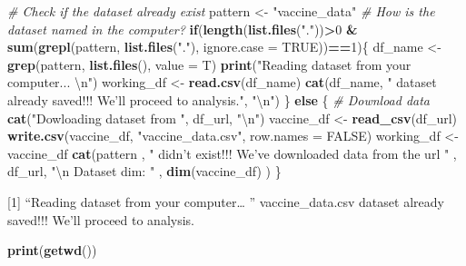 \documentclass[]{article}
\newenvironment{Shaded}{\begin{snugshade}}{\end{snugshade}}
\newcommand{\CharTok}[1]{\textcolor[rgb]{0.31,0.60,0.02}{#1}}
\newcommand{\CommentTok}[1]{\textcolor[rgb]{0.56,0.35,0.01}{\textit{#1}}}
\newcommand{\ControlFlowTok}[1]{\textcolor[rgb]{0.13,0.29,0.53}{\textbf{#1}}}
\newcommand{\DataTypeTok}[1]{\textcolor[rgb]{0.13,0.29,0.53}{#1}}
\newcommand{\DecValTok}[1]{\textcolor[rgb]{0.00,0.00,0.81}{#1}}
\newcommand{\KeywordTok}[1]{\textcolor[rgb]{0.13,0.29,0.53}{\textbf{#1}}}
\newcommand{\NormalTok}[1]{#1}
\newcommand{\OperatorTok}[1]{\textcolor[rgb]{0.81,0.36,0.00}{\textbf{#1}}}
\newcommand{\OtherTok}[1]{\textcolor[rgb]{0.56,0.35,0.01}{#1}}
\newcommand{\StringTok}[1]{\textcolor[rgb]{0.31,0.60,0.02}{#1}}
\begin{document}
\begin{Shaded}
\begin{Highlighting}[]
\CommentTok{# Check if the dataset already exist}
\NormalTok{pattern <-}\StringTok{ "vaccine_data"} \CommentTok{# How is the dataset named in the computer?}
\ControlFlowTok{if}\NormalTok{(}\KeywordTok{length}\NormalTok{(}\KeywordTok{list.files}\NormalTok{(}\StringTok{"."}\NormalTok{))}\OperatorTok{>}\DecValTok{0} \OperatorTok{&}\StringTok{ }\KeywordTok{sum}\NormalTok{(}\KeywordTok{grepl}\NormalTok{(pattern, }\KeywordTok{list.files}\NormalTok{(}\StringTok{"."}\NormalTok{), }\DataTypeTok{ignore.case =} \OtherTok{TRUE}\NormalTok{))}\OperatorTok{==}\DecValTok{1}\NormalTok{)\{}
\NormalTok{    df_name <-}\StringTok{ }\KeywordTok{grep}\NormalTok{(pattern, }\KeywordTok{list.files}\NormalTok{(), }\DataTypeTok{value =}\NormalTok{ T)}
    \KeywordTok{print}\NormalTok{(}\StringTok{"Reading dataset from your computer... }\CharTok{\textbackslash{}n}\StringTok{"}\NormalTok{)}
\NormalTok{    working_df <-}\StringTok{ }\KeywordTok{read.csv}\NormalTok{(df_name)}
    \KeywordTok{cat}\NormalTok{(df_name, }\StringTok{" dataset already saved!!! We'll proceed to analysis."}\NormalTok{, }\StringTok{"}\CharTok{\textbackslash{}n}\StringTok{"}\NormalTok{)}
\NormalTok{\} }\ControlFlowTok{else}\NormalTok{ \{}
    \CommentTok{# Download data}
    \KeywordTok{cat}\NormalTok{(}\StringTok{"Dowloading dataset from "}\NormalTok{, df_url, }\StringTok{"}\CharTok{\textbackslash{}n}\StringTok{"}\NormalTok{)}
\NormalTok{    vaccine_df <-}\StringTok{ }\KeywordTok{read_csv}\NormalTok{(df_url)}
    \KeywordTok{write.csv}\NormalTok{(vaccine_df, }\StringTok{"vaccine_data.csv"}\NormalTok{, }\DataTypeTok{row.names =} \OtherTok{FALSE}\NormalTok{)}
\NormalTok{    working_df <-}\StringTok{ }\NormalTok{vaccine_df}
    \KeywordTok{cat}\NormalTok{(pattern}
\NormalTok{        , }\StringTok{" didn't exist!!! We've downloaded data from the url "}
\NormalTok{        , df_url, }\StringTok{"}\CharTok{\textbackslash{}n}\StringTok{ Dataset dim: "}
\NormalTok{        , }\KeywordTok{dim}\NormalTok{(vaccine_df)}
\NormalTok{    )}
\NormalTok{\}}
\end{Highlighting}
\end{Shaded}

{[}1{]} ``Reading dataset from your computer\ldots{} \n''
vaccine\_data.csv dataset already saved!!! We'll proceed to analysis.

\begin{Shaded}
\begin{Highlighting}[]
\KeywordTok{print}\NormalTok{(}\KeywordTok{getwd}\NormalTok{())}
\end{Highlighting}
\end{Shaded}
\end{document}
